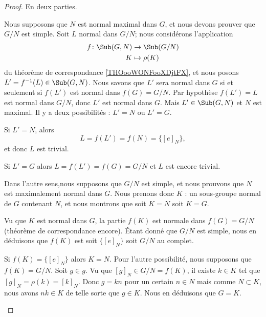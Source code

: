 \begin{proof}
	En deux parties.
	\begin{subproof}
		\spitem[\( \Rightarrow\)]
		Nous supposons que \( N\) est normal maximal dans \( G\), et nous devons prouver que \( G/N\) est simple. Soit \( L\) normal dans \( G/N\); nous considérons l'application
		\begin{equation}
			\begin{aligned}
				f\colon \Sub(G,N) & \to \Sub(G/N)   \\
				K                 & \mapsto \rho(K)
			\end{aligned}
		\end{equation}
		du théorème de correspondance \ref{THOooWONFooXDjtFX}, et nous posons \( L'=f^{-1}(L)\in\Sub(G,N)\). Nous savons que \( L'\) sera normal dans \( G\) si et seulement si \( f(L')\) est normal dans \( f(G)=G/N\). Par hypothèse \( f(L')=L\) est normal dans \( G/N\), donc \( L'\) est normal dans \( G\). Mais \( L'\in\Sub(G,N)\) et \( N\) est maximal. Il y a deux possibilités : \( L'=N\) ou \( L'=G\).

		Si \( L'=N\), alors
		\begin{equation}
			L=f(L')=f(N)=\{ [e]_N \},
		\end{equation}
		et donc \( L\) est trivial.

		Si \( L'=G\) alors \( L=f(L')=f(G)=G/N\) et \( L\) est encore trivial.


		\spitem[\( \Leftarrow\)]
		Dans l'autre sens,nous supposons que \( G/N\) est simple, et nous prouvons que \( N\) est maximalement normal dans \( G\). Nous prenons donc \( K\) : un sous-groupe normal de \( G\) contenant \( N\), et nous montrons que soit \( K=N\) soit \( K=G\).

		Vu que \( K\) est normal dans \( G\), la partie \( f(K)\) est normale dans \( f(G)=G/N\) (théorème de correspondance encore). Étant donné que \( G/N\) est simple, nous en déduisons que \( f(K)\) est soit \( \{ [e]_N \}\) soit \( G/N\) au complet.

		Si \( f(K)=\{ [e]_N \}\) alors \( K=N\). Pour l'autre possibilité, nous supposons que \( f(K)=G/N\). Soit \( g\in g\). Vu que \( [g]_N\in G/N=f(K)\), il existe \( k\in K\) tel que \( [g]_N=\rho(k)=[k]_N\). Donc \( g=kn\) pour un certain \( n\in N\) mais comme \( N\subset K\), nous avons \( nk\in K\) de telle sorte que \( g\in K\). Nous en déduisons que \( G=K\).
	\end{subproof}
\end{proof}




